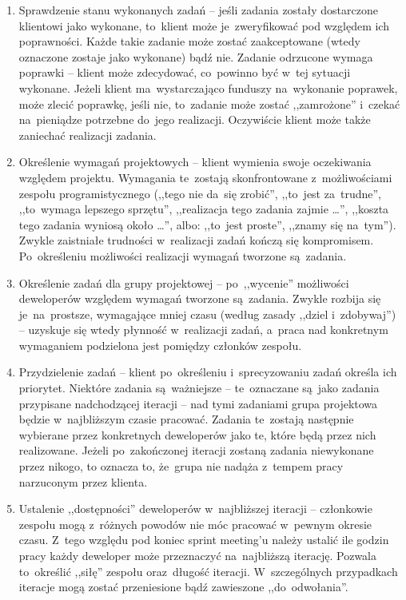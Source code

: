 \begin{enumerate}
  \item Sprawdzenie stanu wykonanych zadań -- jeśli zadania zostały dostarczone klientowi jako wykonane, to~klient może je~zweryfikować pod względem ich poprawności. Każde takie zadanie może zostać zaakceptowane (wtedy oznaczone zostaje jako wykonane) bądź nie. Zadanie odrzucone wymaga poprawki -- klient może zdecydować, co~powinno być w~tej sytuacji wykonane. Jeżeli klient ma~wystarczająco funduszy na~wykonanie poprawek, może zlecić poprawkę, jeśli nie, to~zadanie może zostać ,,zamrożone'' i~czekać na~pieniądze potrzebne do~jego realizacji. Oczywiście klient może także zaniechać realizacji zadania.
  \item Określenie wymagań projektowych -- klient wymienia swoje oczekiwania względem projektu. Wymagania te~zostają skonfrontowane z~możliwościami zespołu programistycznego (,,tego nie da~się zrobić'', ,,to~jest za~trudne'', ,,to~wymaga lepszego sprzętu'', ,,realizacja tego zadania zajmie \ldots'', ,,koszta tego zadania wyniosą około \ldots'', albo: ,,to~jest proste'', ,,znamy się na~tym''). Zwykle zaistniałe trudności w~realizacji zadań kończą się kompromisem. Po~określeniu możliwości realizacji wymagań tworzone są~zadania.
  \item Określenie zadań dla grupy projektowej -- po~,,wycenie'' możliwości deweloperów względem wymagań tworzone są~zadania. Zwykle rozbija się je~na~prostsze, wymagające mniej czasu (według zasady ,,dziel i~zdobywaj'') -- uzyskuje się wtedy płynność w~realizacji zadań, a~praca nad konkretnym wymaganiem podzielona jest pomiędzy członków zespołu.
  \item Przydzielenie zadań -- klient po~określeniu i~sprecyzowaniu zadań określa ich priorytet. Niektóre zadania są~ważniejsze -- te~oznaczane są~jako zadania przypisane nadchodzącej iteracji -- nad tymi zadaniami grupa projektowa będzie w~najbliższym czasie pracować. Zadania te~zostają następnie wybierane przez konkretnych deweloperów jako te, które będą przez nich realizowane. Jeżeli po~zakończonej iteracji zostaną zadania niewykonane przez nikogo, to oznacza to, że~grupa nie nadąża z~tempem pracy narzuconym przez klienta.
  \item Ustalenie ,,dostępności'' deweloperów w~najbliższej iteracji -- członkowie zespołu mogą z~różnych powodów nie móc pracować w~pewnym okresie czasu. Z~tego względu pod koniec sprint meeting'u należy ustalić ile godzin pracy każdy deweloper może przeznaczyć na~najbliższą iterację. Pozwala to~określić ,,siłę'' zespołu oraz~długość iteracji. W~szczególnych przypadkach iteracje mogą zostać przeniesione bądź zawieszone ,,do~odwołania''.
\end{enumerate}

